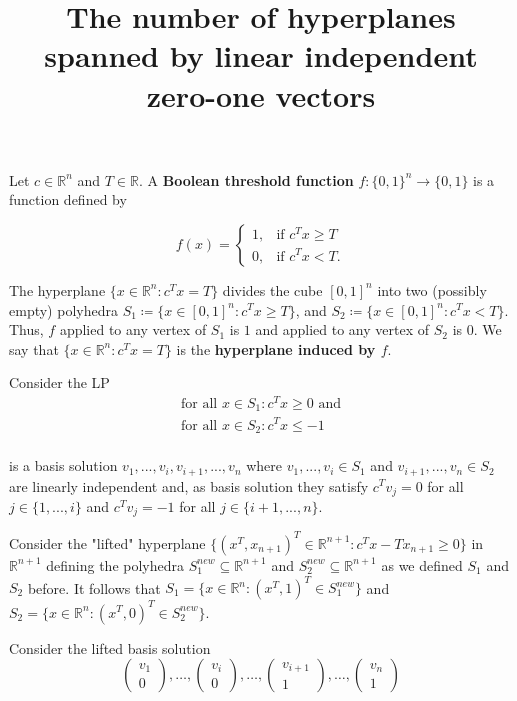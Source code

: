 \documentclass[11pt]{amsart}
\title{The number of hyperplanes spanned by linear independent zero-one vectors}
\theoremstyle{definition}
\theoremstyle{definition}
\newcommand\Def[1]{{\bf #1}}
\begin{document}
\maketitle

Let $c \in \mathbb{R}^n$ and $T \in \mathbb{R}$. 
A \Def{Boolean threshold function} $f \colon \{0,1 \}^n \rightarrow \{0,1 \}$ is a function defined by

\begin{equation*}
  f(x)=\begin{cases}
    1, & \text{if $c^Tx \geq T$}\\
    0, & \text{if $c^Tx < T$}.
  \end{cases}
\end{equation*}

The hyperplane $\{ x \in \mathbb{R}^n : c^Tx = T \} $ divides the cube $[0,1]^n$ into two (possibly empty) polyhedra $S_1 \coloneqq \{ x \in [0,1]^n : c^Tx \geq T \}$, and $S_2 \coloneqq \{ x \in [0,1]^n : c^Tx < T \} $. 
Thus, $f$ applied to any vertex of $S_1$ is $1$ and applied to any vertex of $S_2$ is $0$. 
We say that $\{ x \in \mathbb{R}^n : c^Tx = T \} $ is the \Def{hyperplane induced by $f$}.

Consider the LP 
\begin{align*}
    \text{for all  } x \in S_1: c^Tx \geq 0 \text{ and} \\
    \text{for all  } x \in S_2: c^Tx \leq -1 \\
\end{align*}

is a basis solution $v_1,...,v_i,v_{i+1},...,v_n$ where $v_1,...,v_i \in S_1 $ and $v_{i+1},..., v_n \in S_2$ are linearly independent and, as basis solution they satisfy $c^Tv_j = 0$ for all $j \in \{1,...,i\}$ and $c^Tv_j = -1$ for all $j \in \{i+1,...,n\}$.

Consider the "lifted" hyperplane $\{ (x^T, x_{n+1})^T \in \mathbb{R}^{n+1} : c^Tx - Tx_{n+1} \geq 0 \} $ in $\mathbb{R}^{n+1}$ defining the polyhedra $S_1^{new} \subseteq \mathbb{R}^{n+1}$ and $S_2^{new} \subseteq \mathbb{R}^{n+1}$ as we defined $S_1$ and $S_2$ before. It follows that $S_1 = \{ x \in \mathbb{R}^n : (x^T,1)^T \in S_1^{new} \}  $ and $S_2 = \{ x \in \mathbb{R}^n : (x^T,0)^T \in S_2^{new} \}  $. 

Consider the lifted basis solution 
\[ \left( \begin{array}{cc}
v_1\\
0 
\end{array} \right),\dots,
%
\left( \begin{array}{cc}
v_i\\
0 
\end{array} \right),\dots,
\left( \begin{array}{cc}
v_{i+1}\\
1
\end{array} \right),\dots,
\left( \begin{array}{cc}
v_n\\
1
\end{array} \right)
\]
\end{document}
